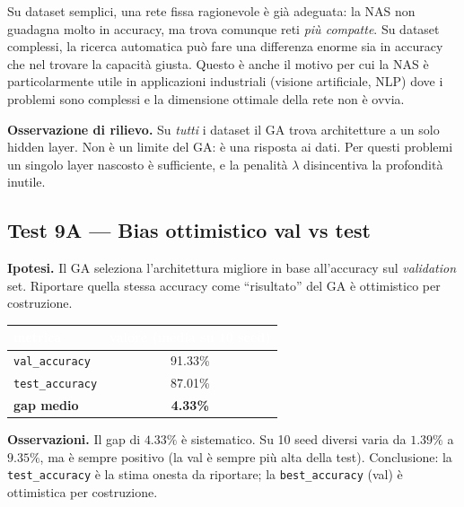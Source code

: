 \documentclass[11pt,a4paper]{article}
\begin{document}
\begin{concetto}
Su dataset semplici, una rete fissa ragionevole è già adeguata: la NAS
non guadagna molto in accuracy, ma trova comunque reti \emph{più
compatte}. Su dataset complessi, la ricerca automatica può fare una
differenza enorme sia in accuracy che nel trovare la capacità giusta.
Questo è anche il motivo per cui la NAS è particolarmente utile in
applicazioni industriali (visione artificiale, NLP) dove i problemi sono
complessi e la dimensione ottimale della rete non è ovvia.
\end{concetto}

\textbf{Osservazione di rilievo.} Su \emph{tutti} i dataset il GA trova
architetture a un solo hidden layer. Non è un limite del GA: è una
risposta ai dati. Per questi problemi un singolo layer nascosto è
sufficiente, e la penalità $\lambda$ disincentiva la profondità inutile.

\subsection{Test 9A — Bias ottimistico val vs test}

\textbf{Ipotesi.} Il GA seleziona l'architettura migliore in base
all'accuracy sul \emph{validation} set. Riportare quella stessa accuracy
come ``risultato'' del GA è ottimistico per costruzione.

\begin{center}
\begin{tabular}{lc}
    \toprule
    \rowcolor{headerblue}
    \textcolor{white}{\textbf{metrica}} &
    \textcolor{white}{\textbf{valore (media su 10 seed)}} \\
    \midrule
    \texttt{val\_accuracy}     & 91.33\%  \\
    \rowcolor{rowgray}
    \texttt{test\_accuracy}    & 87.01\%  \\
    \textbf{gap medio}         & \textbf{4.33\%} \\
    \bottomrule
\end{tabular}
\end{center}

\textbf{Osservazioni.}
Il gap di $4.33\%$ è sistematico. Su 10 seed diversi varia da $1.39\%$ a
$9.35\%$, ma è sempre positivo (la val è sempre più alta della test).
Conclusione: la \texttt{test\_accuracy} è la stima onesta da riportare;
la \texttt{best\_accuracy} (val) è ottimistica per costruzione.
\end{document}
